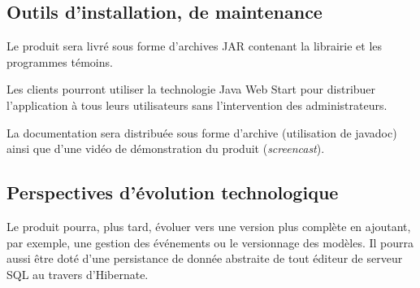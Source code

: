 \subsection{Outils d’installation, de maintenance}

Le produit sera livré sous forme d'archives JAR contenant la librairie et les programmes témoins.

Les clients pourront utiliser la technologie Java Web Start pour distribuer l'application à tous leurs utilisateurs sans l'intervention des administrateurs.

La documentation sera distribuée sous forme d'archive (utilisation de javadoc) ainsi que d'une vidéo de démonstration du produit (\emph{screencast}).

\subsection{Perspectives d’évolution technologique}

Le produit pourra, plus tard, évoluer vers une version plus complète en ajoutant, par exemple, une gestion des événements ou le versionnage des modèles.
Il pourra aussi être doté d'une persistance de donnée abstraite de tout éditeur de serveur SQL au travers d'Hibernate.